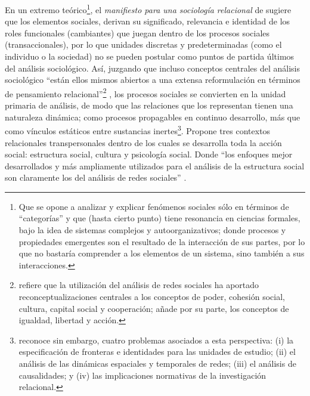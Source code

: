 \documentclass[letterpaper, 11pt]{book}
\theoremstyle{definition}
\theoremstyle{remark}
\begin{document}
En un extremo teórico\footnote{
    Que se opone a analizar y explicar fenómenos sociales sólo en términos de ``categorías'' y que (hasta cierto punto) tiene resonancia en ciencias formales, bajo la idea de sistemas complejos y autoorganizativos; donde procesos y propiedades emergentes son el resultado de la interacción de sus partes, por lo que no bastaría comprender a los elementos de un sistema, sino también a sus interacciones. 
}, 
el \emph{manifiesto para una sociología relacional} de \citet{1997_Emirbayer_manifiesto} sugiere que los elementos sociales, derivan su significado, relevancia e identidad de los roles funcionales (cambiantes) que juegan dentro de los procesos sociales (transaccionales), por lo que unidades discretas y predeterminadas (como el individuo o la sociedad) no se pueden postular como puntos de partida últimos del análisis sociológico. 
Así, juzgando que incluso conceptos centrales del análisis sociológico ``están ellos mismos abiertos a una extensa reformulación en términos de pensamiento relacional''\footnote{
    \citet{2011_Aguirre_introduccionSNA} refiere que la utilización del análisis de redes sociales ha aportado reconceptualizaciones centrales a los conceptos de poder, cohesión social, cultura, capital social y cooperación; \citet{1997_Emirbayer_manifiesto} añade por su parte, los conceptos de igualdad, libertad y acción.
} 
\citep[291]{1997_Emirbayer_manifiesto}, 
los procesos sociales se convierten en la unidad primaria de análisis, de modo que las relaciones que los representan tienen una naturaleza dinámica; como procesos propagables en continuo desarrollo, más que como vínculos estáticos entre sustancias inertes\footnote{
    \citet{1997_Emirbayer_manifiesto} reconoce sin embargo, cuatro problemas asociados a esta perspectiva: 
    (i) la especificación de fronteras e identidades para las unidades de estudio; 
    (ii) el análisis de las dinámicas espaciales y temporales de redes; 
    (iii) el análisis de causalidades; y 
    (iv) las implicaciones normativas de la investigación relacional. 
}. 
Propone tres contextos relacionales transpersonales dentro de los cuales se desarrolla toda la acción social: estructura social, cultura y psicología social. 
Donde ``los enfoques mejor desarrollados y más ampliamente utilizados para el análisis de la estructura social son claramente los del análisis de redes sociales'' \citep[298]{1997_Emirbayer_manifiesto}. 
\end{document}
